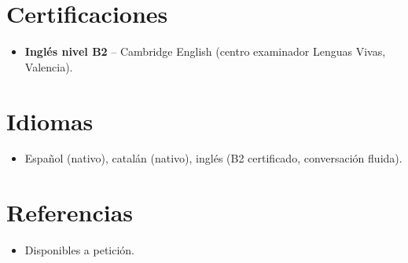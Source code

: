 \documentclass[11pt,a4paper,sans]{moderncv}
\begin{document}

\section{Certificaciones}
\vspace{1pt}
\begin{itemize}
\item \textbf{Inglés nivel B2} -- Cambridge English (centro examinador Lenguas Vivas, Valencia).
\end{itemize}


\section{Idiomas}
\vspace{1pt}
\begin{itemize}
\item Español (nativo), catalán (nativo), inglés (B2 certificado, conversación fluida).
\end{itemize}


\section{Referencias}
\vspace{1pt}
\begin{itemize}
\item{Disponibles a petición.}
\end{itemize}
\end{document}
